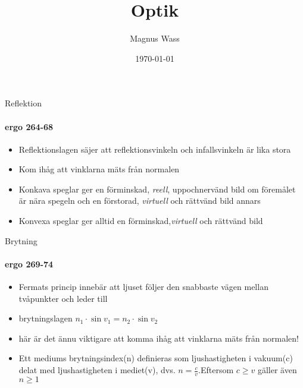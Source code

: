 \documentclass{beamer}
\title{Optik}
\subtitle{}
\date{\today}
\author{Magnus Wass}
\institute{\url{magnus.wass@nykopingsgymnasium.com}}
\begin{document}
\maketitle

\begin{frame}{Reflektion}
  \framesubtitle{ergo 264-68}





      \begin{itemize}
        \item \alert{Reflektionslagen} s\"ajer att reflektionsvinkeln 
        och infallsvinkeln \"ar lika stora
        \item Kom ih\aa g att vinklarna m\"ats fr\aa n \alert{normalen}
        \item \alert{Konkava speglar} ger en f\"orminskad, \emph{reell}, uppochnerv\"and 
        bild om f\"orem\aa let \"ar n\"ara spegeln och en f\"orstorad, \emph{virtuell} och
        r\"attv\"and bild annars
        \item \alert{Konvexa speglar} ger alltid en f\"orminskad,\emph{virtuell} och
        r\"attv\"and bild
      \end{itemize}


\end{frame}





\begin{frame}{Brytning}
\framesubtitle{ergo 269-74}
\begin{itemize}
\item \alert{Fermats princip} inneb\"ar att ljuset f\"oljer den snabbaste v\"agen mellan tv\aa punkter och leder till
 \item \alert{brytningslagen} $n_1\cdot \sin v_1=n_2\cdot \sin v_2$
 \item h\"ar \"ar det \"annu viktigare att komma ih\aa g att vinklarna m\"ats fr\aa n normalen!
 \item Ett mediums \alert{brytningsindex(n)} definieras som ljushastigheten i vakuum(c) delat med ljushastigheten i mediet(v), dvs. $n=\frac{c}{v}$.Eftersom $c \geq v$ g\"aller \"aven $n \geq 1$ 
\end{itemize}
\end{frame}
\end{document}
